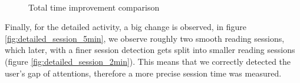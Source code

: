 \begin{figure}[!htb]
	\myfloatalign
	 \quad 
	 \\
	\caption{Total time improvement comparison}\label{fig:total_time_comparison}
\end{figure}

Finally, for the detailed activity, a big change is observed, in figure \ref{fig:detailed_session_5min}, we observe roughly two smooth reading sessions, which later, with a finer session detection gets split into smaller reading sessions (figure \ref{fig:detailed_session_2min}). This means that we correctly detected the user's gap of attentions, therefore a more precise session time was measured.

